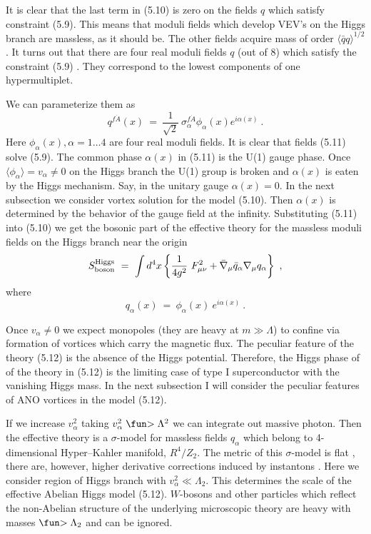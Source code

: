 \documentclass[a4paper,12pt]{article}
\def\ga{\mathrel{\mathpalette\fun >}}
\def\fun#1#2{\lower3.6pt\vbox{\baselineskip0pt\lineskip.9pt
\ialign{$\mathsurround=0pt#1\hfil##\hfil$\crcr#2\crcr\sim\crcr}}}
\begin{document}
It is clear that the last term in (5.10) is zero on the fields
$q$ which satisfy constraint (5.9). This means that moduli
fields which develop VEV's on the Higgs branch are massless, as
it should be. The other fields acquire mass of order
$\langle\bar qq\rangle^{1/2}$. It turns out that there are four
real moduli fields $q$ (out of 8) which satisfy the constraint
(5.9) \cite{SW2}. They correspond to the lowest components of  one
hypermultiplet.

We can parameterize them as
\begin{equation}
q^{f\dot A}(x)\ =\ \frac1{\sqrt2}\ \sigma^{f\dot A}_\alpha
\phi_\alpha(x) e^{i\alpha(x)}\ .
\end{equation}
Here $\phi_\alpha(x), \alpha=1\ldots4$ are four real moduli
fields. It is clear that fields (5.11) solve (5.9). The common
phase $\alpha(x)$ in (5.11) is the U(1) gauge phase. Once
$\langle\phi_\alpha\rangle=v_\alpha\neq0$ on the Higgs branch the U(1)
group is broken and $\alpha(x)$ is eaten by the Higgs  mechanism.
Say, in the unitary gauge $\alpha(x)=0$. In the next subsection
we consider vortex solution for the model (5.10). Then
$\alpha(x)$ is determined by the behavior of the gauge field at
the infinity. Substituting (5.11) into (5.10) we get the bosonic
part of the effective theory
for the massless moduli fields  on the Higgs branch near the origin
\begin{equation}
S^{\rm Higgs}_{\rm boson}\ =\ \int d^4x\left\{\frac1{4g^2}\
F^2_{\mu\nu}+\bar\nabla_\mu\bar q_\alpha\nabla_\mu
q_\alpha\right\}\ ,
\end{equation}
where
\begin{equation}
q_\alpha(x)\ =\ \phi_\alpha(x)\ e^{i\alpha(x)}\ .
\end{equation}

Once $v_\alpha\neq0$ we expect monopoles (they are heavy at
$m\gg\Lambda$) to confine via formation of vortices which carry
the magnetic flux. The peculiar feature of the theory (5.12) is
the absence of the Higgs potential. Therefore, the Higgs phase of
of the theory in
(5.12) is the limiting case of type I superconductor with the
vanishing Higgs mass. In the next subsection I will consider the
peculiar features of ANO vortices in the model (5.12).

If we increase $v^2_\alpha$ taking $v^2_\alpha\ga\Lambda^2$ we
can integrate out massive photon. Then the effective theory is a
$\sigma$-model for massless fields $q_\alpha$ which belong to
4-dimensional Hyper--Kahler manifold, $R^4/Z_2$. The metric of
this $\sigma$-model is flat \cite{SW2,APS}, there are, however,
higher derivative corrections induced by instantons \cite{Y2}. 
Here we consider region of Higgs branch with
$v^2_\alpha\ll\Lambda_2$. This determines the scale of the
effective Abelian Higgs model (5.12). $W$-bosons and other
particles which reflect the non-\-Abelian structure of the
underlying microscopic theory are heavy with masses
$\ga\Lambda_2$ and can be ignored.
\end{document}
